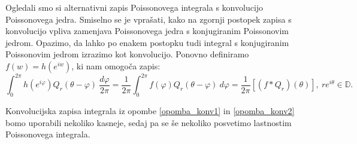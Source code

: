 \documentclass[mat1]{fmfdelo}
\begin{document}
     \begin{opomba}
        \label{opomba_konv2}
        Ogledali smo si alternativni zapis Poissonovega integrala s konvolucijo Poissonovega jedra. Smiselno se je vprašati, kako na zgornji postopek zapisa s konvolucijo vpliva zamenjava Poissonovega jedra s konjugiranim Poissonovim jedrom. Opazimo, da lahko po enakem postopku tudi integral s konjugiranim Poissonovim jedrom izrazimo kot konvolucijo. 
        Ponovno definiramo $f(w) = h(e^{i w})$, ki nam omogoča zapis:
        \begin{equation*}
            \int_{0}^{2\pi}{h(e^{i\varphi}) Q_r(\theta - \varphi)~\frac{d\varphi}{2 \pi}}  = \frac{1}{2\pi}\int_{0}^{2 \pi}{f(\varphi) Q_r(\theta - \varphi)~d\varphi} = \frac{1}{2 \pi}[(f * Q_r)(\theta)],~re^{i\theta} \in \mathbb{D}.
        \end{equation*}
     \end{opomba}
     Konvolucijska zapisa integrala iz opombe \ref{opomba_konv1} in \ref{opomba_konv2} bomo uporabili nekoliko kasneje, sedaj pa se še nekoliko posvetimo lastnostim Poissonovega integrala.
\end{document}
